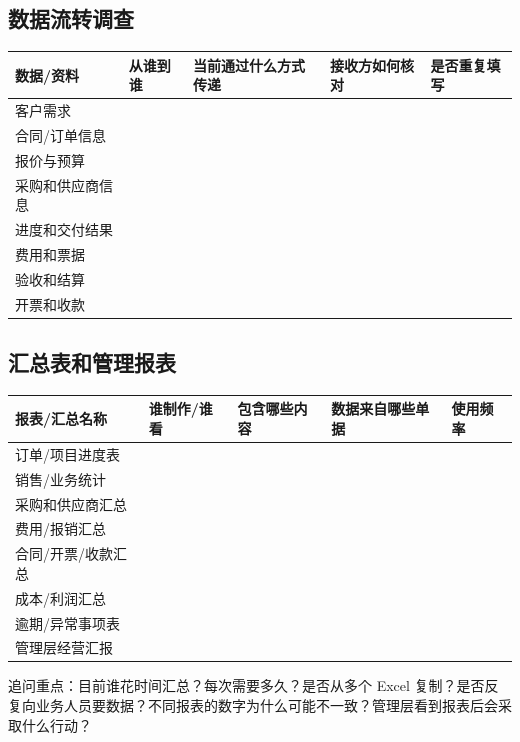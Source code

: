 \documentclass[UTF8,a4paper,11pt]{ctexart}
\begin{document}
\subsection{数据流转调查}
\begin{longtable}{p{}p{}p{}p{}p{}}
\toprule
数据/资料 & 从谁到谁 & 当前通过什么方式传递 & 接收方如何核对 & 是否重复填写 \\
\midrule
客户需求 & & & & \\
合同/订单信息 & & & & \\
报价与预算 & & & & \\
采购和供应商信息 & & & & \\
进度和交付结果 & & & & \\
费用和票据 & & & & \\
验收和结算 & & & & \\
开票和收款 & & & & \\
\bottomrule
\end{longtable}

\subsection{汇总表和管理报表}
\begin{longtable}{p{}p{}p{}p{}p{}}
\toprule
报表/汇总名称 & 谁制作/谁看 & 包含哪些内容 & 数据来自哪些单据 & 使用频率 \\
\midrule
订单/项目进度表 & & & & \\
销售/业务统计 & & & & \\
采购和供应商汇总 & & & & \\
费用/报销汇总 & & & & \\
合同/开票/收款汇总 & & & & \\
成本/利润汇总 & & & & \\
逾期/异常事项表 & & & & \\
管理层经营汇报 & & & & \\
\bottomrule
\end{longtable}

追问重点：目前谁花时间汇总？每次需要多久？是否从多个 Excel 复制？是否反复向业务人员要数据？不同报表的数字为什么可能不一致？管理层看到报表后会采取什么行动？
\end{document}
